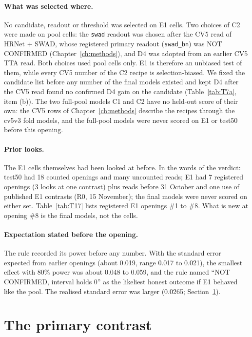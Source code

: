 \paragraph{What was selected where.} No candidate, readout or threshold was selected on E1 cells. Two choices of C2 were made
on pool cells: the \texttt{swad} readout was chosen after the CV5 read of HRNet + SWAD, whose registered primary readout
(\texttt{swad\_bn}) was NOT CONFIRMED (Chapter~\ref{ch:methods}), and D4 was adopted from an earlier CV5 TTA read. Both choices
used pool cells only. E1 is therefore an unbiased test of them, while every CV5 number of the C2 recipe is selection-biased. We
fixed the candidate list before any number of the final models existed and kept D4 after the CV5 read found no confirmed D4
gain on the candidate (Table~\ref{tab:T7a}, item (b)). The two full-pool models C1 and C2 have no held-out score of their own:
the CV5 rows of Chapter~\ref{ch:methods} describe the recipes through the cv5v3 fold models, and the full-pool models were never
scored on E1 or test50 before this opening.

\paragraph{Prior looks.} The E1 cells themselves had been looked at before. In the words of the verdict: test50 had 18
counted openings and many uncounted reads; E1 had 7 registered openings (3 looks at one contrast) plus reads before 31 October
and one use of published E1 contrasts (R0, 15 November); the final models were never scored on either set.
Table~\ref{tab:T17} lists registered E1 openings \#1 to \#8. What is new at opening \#8 is the final models, not the cells.

\paragraph{Expectation stated before the opening.} The rule recorded its power before any number. With the standard error
expected from earlier openings (about 0.019, range 0.017 to 0.021), the smallest effect with 80\% power was about 0.048 to 0.059, and the rule named
``NOT CONFIRMED, interval holds 0'' as the likeliest honest outcome if E1 behaved like the pool. The realised standard error was
larger (0.0265; Section~\ref{sec:e1-primary}).

\section{The primary contrast}\label{sec:e1-primary}

